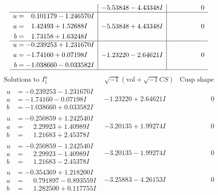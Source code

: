 \documentclass[1p]{elsarticle_modified}
\theoremstyle{definition}
\newcommand{\I}{\sqrt{-1}}
\begin{document}
$$\begin{array}{c|c|c}
 & -5.53848 - 4.43348 I & \phantom{-0.000000 } 0 \\ \hline\begin{aligned}
u &= \phantom{-}0.101179 - 1.246570 I \\
a &= \phantom{-}1.42493 + 1.52688 I \\
b &= \phantom{-}1.73158 + 1.63248 I\end{aligned}
 & -5.53848 + 4.43348 I & \phantom{-0.000000 } 0 \\ \hline\begin{aligned}
u &= -0.239253 + 1.231670 I \\
a &= -1.74160 + 0.07198 I \\
b &= -1.038660 - 0.033582 I\end{aligned}
 & -1.23220 - 2.64621 I & \phantom{-0.000000 } 0\\
 \hline 
 \end{array}$$\newpage$$\begin{array}{c|c|c}  
\text{Solutions to }I^u_{1}& \I (\text{vol} + \sqrt{-1}CS) & \text{Cusp shape}\\
 \hline 
\begin{aligned}
u &= -0.239253 - 1.231670 I \\
a &= -1.74160 - 0.07198 I \\
b &= -1.038660 + 0.033582 I\end{aligned}
 & -1.23220 + 2.64621 I & \phantom{-0.000000 } 0 \\ \hline\begin{aligned}
u &= -0.250859 + 1.242540 I \\
a &= \phantom{-}2.29923 + 1.40989 I \\
b &= \phantom{-}1.21683 + 2.45378 I\end{aligned}
 & -3.20135 + 1.99274 I & \phantom{-0.000000 } 0 \\ \hline\begin{aligned}
u &= -0.250859 - 1.242540 I \\
a &= \phantom{-}2.29923 - 1.40989 I \\
b &= \phantom{-}1.21683 - 2.45378 I\end{aligned}
 & -3.20135 - 1.99274 I & \phantom{-0.000000 } 0 \\ \hline\begin{aligned}
u &= -0.354369 + 1.218200 I \\
a &= \phantom{-}0.791897 - 0.893559 I \\
b &= \phantom{-}1.282500 + 0.117755 I\end{aligned}
 & -3.25883 - 4.26153 I & \phantom{-0.000000 } 0 \\ \hline\begin{aligned}

\end{aligned}
\end{array}$$
\end{document}
